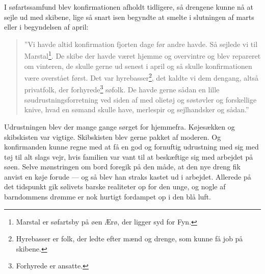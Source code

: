 I søfartssamfund blev konfirmationen afholdt tidligere, så drengene
kunne nå at sejle ud med skibene, lige så snart isen begyndte at smelte
i slutningen af marts eller i begyndelsen af april:

\begin{quote}
''Vi havde altid konfirmation fjorten dage før andre havde. Så sejlede
vi til Marstal\footnote{Marstal er søfartsby på øen Ærø, der ligger syd
  for Fyn.}. De skibe der havde været hjemme og overvintre og blev
repareret om vinteren, de skulle gerne ud senest i april og så skulle
konfirmationen være overstået først. Det var hyrebasser\footnote{Hyrebasser
  er folk, der ledte efter mænd og drenge, som kunne få job på skibene.},
det kaldte vi dem dengang, altså privatfolk, der forhyrede\footnote{Forhyrede
  er ansatte.} søfolk. De havde gerne sådan en lille
søudrustningsforretning ved siden af med olietøj og søstøvler og
forskellige knive, hvad en sømand skulle have, merlespir og sejlhandsker
og sådan.''
\end{quote}

Udrustningen blev der mange gange sørget for hjemmefra. Køjesækken og
skibskisten var vigtige. Skibskisten blev gerne pakket af moderen. Og
konfirmanden kunne regne med at få en god og fornuftig udrustning med
sig med tøj til alt slags vejr, hvis familien var vant til at beskæftige
sig med arbejdet på søen. Selve mønstringen om bord foregik på den måde,
at den nye dreng fik anvist en køje forude --- og så blev han straks
kastet ud i arbejdet. Allerede på det tidspunkt gik sølivets barske
realiteter op for den unge, og nogle af barndommens drømme er nok
hurtigt fordampet op i den blå luft.

